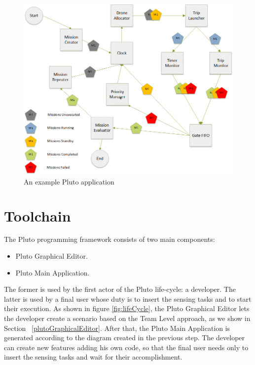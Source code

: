 \begin{figure}[htb]
  \centering
  \includegraphics[width=\linewidth]{pictures/BlocksDiagram.png}
  \caption{An example Pluto application}
  \label{fig:BlocksDiagram}
\end{figure}

\section{Toolchain}\label{toolchain}

The Pluto programming framework consists of two main components:
\begin{itemize}
\item Pluto Graphical Editor.
\item Pluto Main Application.
\end{itemize}
The former is used by the first actor of the Pluto life-cycle: a developer. The latter is used by a final user whose duty is to insert the sensing tasks and to start their execution.
As shown in figure \ref{fig:lifeCycle}, the Pluto Graphical Editor lets the developer create a scenario based on the Team Level approach, as we show in Section ~\ref{plutoGraphicalEditor}.
After that, the Pluto Main Application is generated according to the diagram created in the previous step. 
The developer can create new features adding his own code, so that the final user needs only to insert the sensing tasks and wait for their accomplishment.

